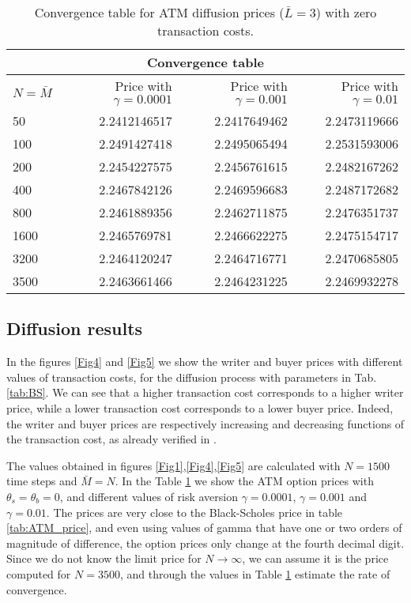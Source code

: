 \begin{table}[h!]
\begin{center}
\begin{minipage}{\linewidth}
\centering
 \begin{tabular}{||l|r|r|r||}
 \hline
  \multicolumn{4}{|c|}{Convergence table} \\
  \hline
  $N = \bar M$ & Price with $\gamma = 0.0001$ & Price with $\gamma = 0.001$ & Price with $\gamma = 0.01$\\
  \hline
    50 & 2.2412146517 & 2.2417649462 & 2.2473119666 \\
  \hline
    100 & 2.2491427418 & 2.2495065494 & 2.2531593006 \\
  \hline  
    200 & 2.2454227575 & 2.2456761615 & 2.2482167262 \\
  \hline
    400 & 2.2467842126 & 2.2469596683 & 2.2487172682 \\
  \hline
    800 & 2.2461889356 & 2.2462711875 & 2.2476351737 \\
  \hline
    1600 & 2.2465769781 & 2.2466622275 & 2.2475154717 \\
  \hline
    3200 & 2.2464120247 & 2.2464716771 & 2.2470685805 \\
  \hline
    3500 & 2.2463661466 & 2.2464231225 & 2.2469932278 \\
  \hline
  \end{tabular}
  \caption{Convergence table for ATM diffusion prices ($\bar L = 3$) with zero transaction costs.}
  \label{tab:convergence}
\end{minipage}
 \end{center}
\end{table}

\subsection{Diffusion results}

In the figures \ref{Fig4} and \ref{Fig5} we show the writer and buyer prices with different values
of transaction costs, for the diffusion process with parameters in Tab. \ref{tab:BS}.  
We can see that a higher transaction cost corresponds to a higher writer price, while a lower transaction cost corresponds to a lower buyer price.
Indeed, the writer and buyer prices are respectively increasing and decreasing functions of the transaction cost, as already verified in \cite{ClHo97}.

The values obtained in figures \ref{Fig1},\ref{Fig4},\ref{Fig5} are calculated with $N=1500$ time steps and $\bar M = N$. 
In the Table \ref{tab:convergence} we show the ATM option prices with $\theta_s = \theta_b = 0$, and different values of risk aversion $\gamma = 0.0001$, 
$\gamma = 0.001$ and $\gamma = 0.01$.
The prices are very close to the Black-Scholes price in table \ref{tab:ATM_price}, 
and even using values of gamma that have one or two orders of magnitude of difference, the option prices only change at the fourth decimal digit. 
Since we do not know the limit price for $N \to \infty$, we can assume it is the price computed for $N=3500$, and through the values in Table \ref{tab:convergence} 
estimate the rate of convergence. 

